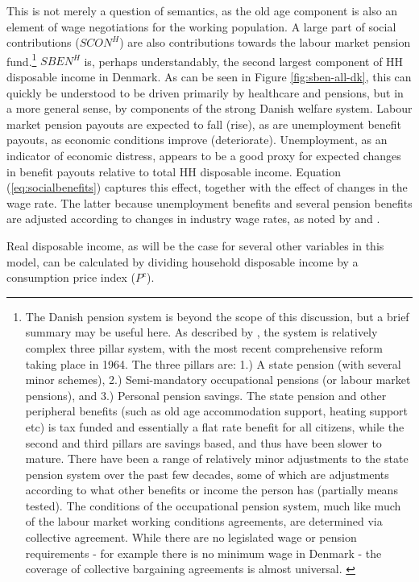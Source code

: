\documentclass[
]{book}
\begin{document}
This is not merely a question of semantics, as the old age component is also an element
of wage negotiations for the working population. A large part of social contributions (\(SCON^H\))
are also contributions towards the labour market pension fund.\footnote{The Danish pension system is beyond the scope of this discussion,
  but a brief summary may be useful here. As described by \citet[pp.~2]{andersen2016dps}, the
  system is relatively complex three pillar system, with the most recent comprehensive
  reform taking place in 1964. The three pillars are:
  1.) A state pension (with several minor schemes),
  2.) Semi-mandatory occupational pensions (or labour market pensions), and
  3.) Personal pension savings.
  The state pension and other peripheral benefits (such as old age accommodation support,
  heating support etc) is tax funded and essentially a flat rate benefit for all citizens,
  while the second and third pillars are savings based, and thus have been slower to mature.
  There have been a range of relatively minor adjustments to the state pension system over
  the past few decades, some of which are adjustments according to what other benefits or
  income the person has (partially means tested). The conditions of the occupational pension
  system, much like much of the labour market working conditions agreements, are determined
  via collective agreement. While there are no legislated wage or pension requirements - for
  example there is no minimum wage in Denmark - the coverage of collective bargaining
  agreements is almost universal. \citep{andersen2016dps}}
\(SBEN^H\) is, perhaps understandably, the second largest component of HH disposable income in Denmark.
As can be seen in Figure \ref{fig:sben-all-dk}, this can quickly be understood to be driven
primarily by healthcare and pensions, but in a more general sense, by components of the strong
Danish welfare system. Labour market pension payouts are expected to fall (rise), as are unemployment
benefit payouts, as economic conditions improve (deteriorate). Unemployment, as an indicator of economic
distress, appears to be a good proxy for expected changes in benefit payouts relative to total HH
disposable income. Equation (\ref{eq:socialbenefits}) captures this effect, together with the
effect of changes in the wage rate. The latter because unemployment benefits and several pension
benefits are adjusted according to changes in industry wage rates, as noted by \citet{byrialsenraza2018}
and \citeyearpar{byrialsenraza2019empirical}.

Real disposable income, as will be the case for several other variables in this model, can be
calculated by dividing household disposable income by a consumption price index (\(P^c\)).
\end{document}
